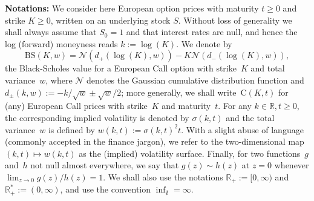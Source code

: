 \documentclass{amsart}[11pt]
\numberwithin{equation}{section}
\theoremstyle{definition}
\newcommand{\RR}{\mathbb{R}}
\newcommand{\Nn}{\mathcal{N}}
\newcommand{\BS}{\mathrm{BS}}
\begin{document}


\textbf{Notations:}
We consider here European option prices with maturity $t\geq 0$ and strike $K\geq 0$, 
written on an underlying stock $S$. 
Without loss of generality we shall always assume that $S_0=1$ and that interest rates are null, 
and hence the log (forward) moneyness reads $k:=\log(K)$.
We denote by 
\begin{equation}\label{eq:BlackScholes}
\BS(K,w) = \Nn(d_+(\log(K), w)) - K \Nn(d_-(\log(K),w)),
\end{equation}
the Black-Scholes value for a European Call option 
with strike~$K$ and total variance~$w$,
where $\Nn$ denotes the Gaussian cumulative distribution function and 
$d_\pm(k,w) := -k/\sqrt{w}\pm \sqrt{w}/2$;
more generally, we shall write~$\mathrm{C}(K, t)$ for (any) European Call prices with strike~$K$ and maturity~$t$.
For any $k\in\RR, t\geq 0$, the corresponding implied volatility is denoted by $\sigma(k,t)$ and the total variance~$w$ is defined by
$w(k,t):=\sigma(k,t)^2 t$.
With a slight abuse of language (commonly accepted in the finance jargon), 
we refer to the two-dimensional map $(k,t)\mapsto w(k,t)$ as the (implied) volatility surface.
Finally, for two functions~$g$ and~$h$ not null almost everywhere, we say that $g(z)\sim h(z)$ at $z=0$ whenever $\lim_{z\to 0}g(z)/h(z)=1$.
We shall also use the notations $\RR_+:=[0,\infty)$ and $\RR^*_+:=(0,\infty)$,
and use the convention $\inf_{\emptyset}=\infty$.
\end{document}
